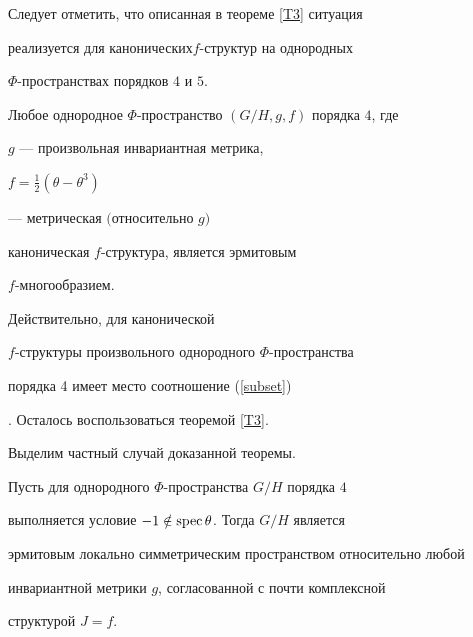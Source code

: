 Следует отметить, что описанная в теореме \ref{T3} ситуация


реализуется для канонических\linebreak $f$-структур на однородных


$\Phi$-пространствах порядков $4$ и $5$.





\begin{thm}\label{T4}


Любое однородное $\Phi$-пространство $(G/H,g,f)$ порядка $4$, где


$g$ --- произвольная инвариантная метрика,


$f=\frac{1}{2}(\theta-\theta^3)$


---  метрическая $($относительно $g)$


каноническая $f$-структура, является эрмитовым


$f$-многообразием.


\end{thm}





\begin{pf}


Действительно, для канонической


$f$-структуры произвольного однородного $\Phi$-пространства


порядка 4 имеет место соотношение (\ref{subset})


\cite{BaDa}. Осталось воспользоваться теоремой \ref{T3}.


\end{pf}





Выделим частный случай доказанной теоремы.





\begin{cornonum}


Пусть для однородного $\Phi$-пространства  $G/H$ порядка $4$


выполняется условие $-1\notin \operatorname{spec}\theta$. Тогда $G/H$ является


эрмитовым локально симметрическим пространством относительно любой


инвариантной метрики $g$, согласованной с почти комплексной


структурой $J=f$.


\end{cornonum}





